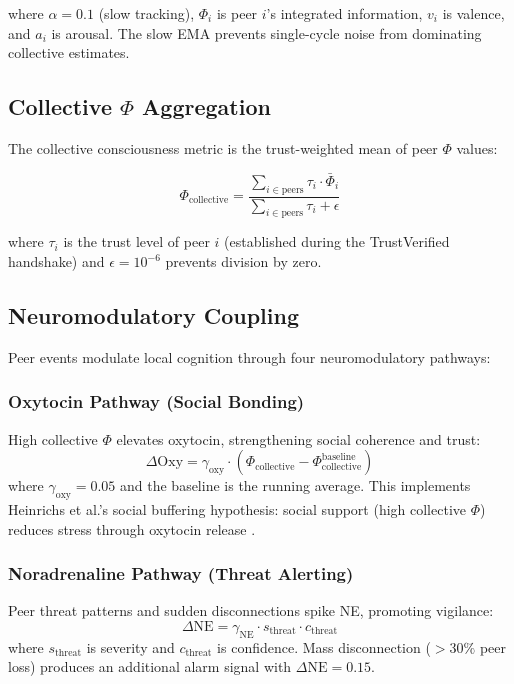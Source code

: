 \documentclass[11pt,a4paper]{article}
\begin{document}
\noindent where $\alpha = 0.1$ (slow tracking), $\Phi_i$ is peer $i$'s integrated information, $v_i$ is valence, and $a_i$ is arousal. The slow EMA prevents single-cycle noise from dominating collective estimates.

\subsection{Collective $\Phi$ Aggregation}

The collective consciousness metric is the trust-weighted mean of peer $\Phi$ values:

\begin{equation}
\Phi_{\text{collective}} = \frac{\sum_{i \in \text{peers}} \tau_i \cdot \bar{\Phi}_i}{\sum_{i \in \text{peers}} \tau_i + \epsilon}
\end{equation}

\noindent where $\tau_i$ is the trust level of peer $i$ (established during the TrustVerified handshake) and $\epsilon = 10^{-6}$ prevents division by zero.

\subsection{Neuromodulatory Coupling}

Peer events modulate local cognition through four neuromodulatory pathways:

\subsubsection{Oxytocin Pathway (Social Bonding)}
High collective $\Phi$ elevates oxytocin, strengthening social coherence and trust:
\begin{equation}
\Delta \text{Oxy} = \gamma_{\text{oxy}} \cdot (\Phi_{\text{collective}} - \Phi_{\text{collective}}^{\text{baseline}})
\end{equation}
where $\gamma_{\text{oxy}} = 0.05$ and the baseline is the running average. This implements Heinrichs et al.'s social buffering hypothesis: social support (high collective $\Phi$) reduces stress through oxytocin release \citep{heinrichs2003}.

\subsubsection{Noradrenaline Pathway (Threat Alerting)}
Peer threat patterns and sudden disconnections spike NE, promoting vigilance:
\begin{equation}
\Delta \text{NE} = \gamma_{\text{NE}} \cdot s_{\text{threat}} \cdot c_{\text{threat}}
\end{equation}
where $s_{\text{threat}}$ is severity and $c_{\text{threat}}$ is confidence. Mass disconnection ($> 30\%$ peer loss) produces an additional alarm signal with $\Delta \text{NE} = 0.15$.
\end{document}

